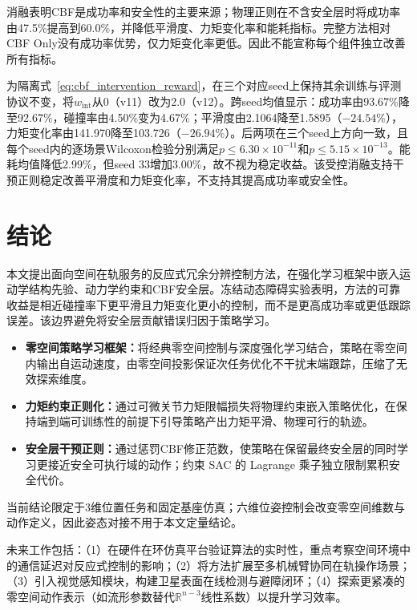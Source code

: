 \documentclass[10pt,conference]{IEEEtran}
\begin{document}
消融表明CBF是成功率和安全性的主要来源；物理正则在不含安全层时将成功率由47.5\%提高到60.0\%，并降低平滑度、力矩变化率和能耗指标。完整方法相对CBF Only没有成功率优势，仅力矩变化率更低。因此不能宣称每个组件独立改善所有指标。

为隔离式~\eqref{eq:cbf_intervention_reward}，在三个对应seed上保持其余训练与评测协议不变，将$w_{\text{int}}$从0（v11）改为2.0（v12）。跨seed均值显示：成功率由93.67\%降至92.67\%，碰撞率由4.50\%变为4.67\%；平滑度由2.1064降至1.5895（$-24.54\%$），力矩变化率由141.970降至103.726（$-26.94\%$）。后两项在三个seed上方向一致，且每个seed内的逐场景Wilcoxon检验分别满足$p\leq6.30\times10^{-11}$和$p\leq5.15\times10^{-13}$。能耗均值降低2.99\%，但seed 33增加3.00\%，故不视为稳定收益。该受控消融支持干预正则稳定改善平滑度和力矩变化率，不支持其提高成功率或安全性。


\section{结论}

本文提出面向空间在轨服务的反应式冗余分辨控制方法，在强化学习框架中嵌入运动学结构先验、动力学约束和CBF安全层。冻结动态障碍实验表明，方法的可靠收益是相近碰撞率下更平滑且力矩变化更小的控制，而不是更高成功率或更低跟踪误差。该边界避免将安全层贡献错误归因于策略学习。

\begin{itemize}
\item \textbf{零空间策略学习框架：}将经典零空间控制与深度强化学习结合，策略在零空间内输出自运动速度，由零空间投影保证次任务优化不干扰末端跟踪，压缩了无效探索维度。

\item \textbf{力矩约束正则化：}通过可微关节力矩限幅损失将物理约束嵌入策略优化，在保持端到端可训练性的前提下引导策略产出力矩平滑、物理可行的轨迹。

\item \textbf{安全层干预正则：}通过惩罚CBF修正范数，使策略在保留最终安全层的同时学习更接近安全可执行域的动作；约束 SAC 的 Lagrange 乘子独立限制累积安全代价。
\end{itemize}

当前结论限定于3维位置任务和固定基座仿真；六维位姿控制会改变零空间维数与动作定义，因此姿态对接不用于本文定量结论。

未来工作包括：（1）在硬件在环仿真平台验证算法的实时性，重点考察空间环境中的通信延迟对反应式控制的影响；（2）将方法扩展至多机械臂协同在轨操作场景；（3）引入视觉感知模块，构建卫星表面在线检测与避障闭环；（4）探索更紧凑的零空间动作表示（如流形参数替代$\mathbb{R}^{n-3}$线性系数）以提升学习效率。


\end{document}
